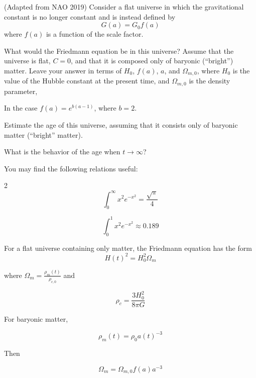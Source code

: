 \documentclass[11pt]{article}
\begin{document}
\begin{pproblem}(Adapted from NAO 2019) 
    Consider a flat universe in which the gravitational constant is no longer constant and is instead defined by
    \[G(a) = G_0 f(a)\]
    where \(f(a)\) is a function of the scale factor.
    \begin{alternativas}
        \item What would the Friedmann equation be in this universe? Assume that the universe is flat, \(C = 0\), and that it is composed only of baryonic (``bright'') matter. Leave your answer in terms of \(H_0\), \(f(a)\), \(a\), and \(\Omega_{m,0}\), where \(H_0\) is the value of the Hubble constant at the present time, and \(\Omega_{m,0}\) is the density parameter,
        
        In the case \(f(a) = e^{b(a-1)}\), where \(b=2\).
        
        \item Estimate the age of this universe, assuming that it consists only of baryonic matter (``bright'' matter).
                
        \item What is the behavior of the age when \(t \rightarrow \infty\)?
    \end{alternativas}

    You may find the following relations useful:
    \begin{paracol}{2}
        \[\int_0^\infty x^2 e^{-x^2} = \frac{\sqrt{\pi}}{4}\]

        \switchcolumn

        \[\int_0^1 x^2 e^{-x^2} \approx 0.189\]
    \end{paracol}

\begin{pssolution*}{}{ }
    \begin{alternativas}
        \item For a flat universe containing only matter, the Friedmann equation has the form
        \[H(t)^2 = H_0^2 \Omega_m\]

        where \(\Omega_m = \frac{\rho_m(t)}{\rho_{c, 0}}\) and

        \[\rho_c = \frac{3 H_0^2}{8\pi G}\]

        For baryonic matter,

        \[\rho_m(t) = \rho_0 a(t)^{-3}\]

        Then

        \[\Omega_m = \Omega_{m,0} f(a) a^{-3}\]


\end{alternativas}
\end{pssolution*}
\end{pproblem}
\end{document}
